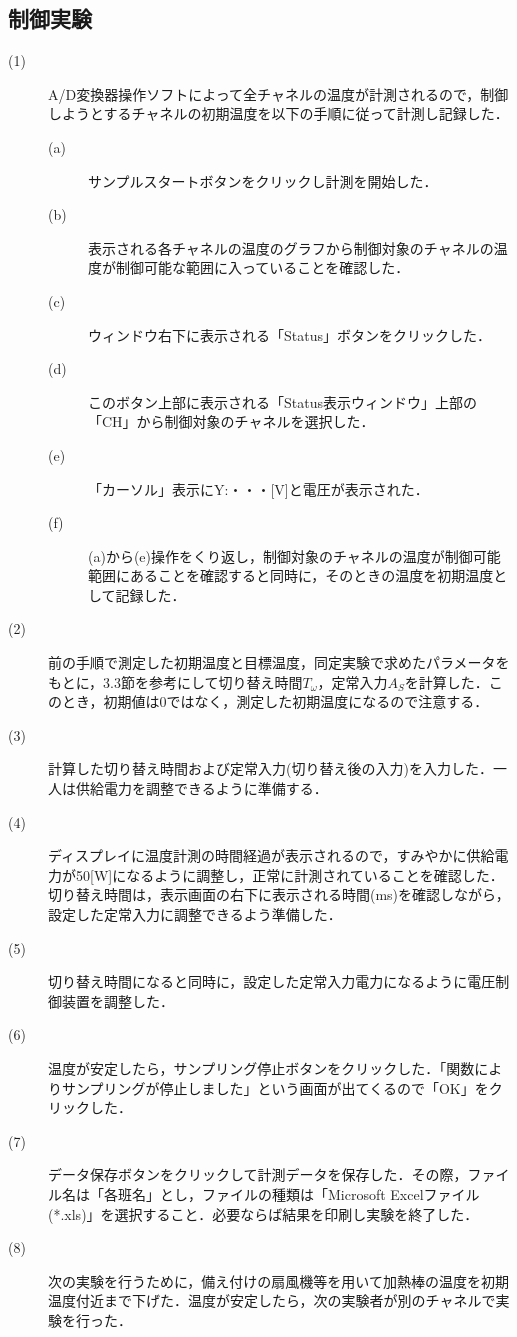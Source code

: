 \documentclass[12pt]{jsarticle}
\begin{document}
\subsection{制御実験}
\begin{description}
  \item[(1)]A/D変換器操作ソフトによって全チャネルの温度が計測されるので，制御しようとするチャネルの初期温度を以下の手順に従って計測し記録した．
  \begin{description}
    \item[(a)]サンプルスタートボタンをクリックし計測を開始した．
    \item[(b)]表示される各チャネルの温度のグラフから制御対象のチャネルの温度が制御可能な範囲に入っていることを確認した．
    \item[(c)]ウィンドウ右下に表示される「Status」ボタンをクリックした．
    \item[(d)]このボタン上部に表示される「Status表示ウィンドウ」上部の「CH」から制御対象のチャネルを選択した．
    \item[(e)]「カーソル」表示にY:・・・[V]と電圧が表示された．
    \item[(f)](a)から(e)操作をくり返し，制御対象のチャネルの温度が制御可能範囲にあることを確認すると同時に，そのときの温度を初期温度として記録した．
  \end{description}
  \item[(2)]前の手順で測定した初期温度と目標温度，同定実験で求めたパラメータをもとに，3.3節を参考にして切り替え時間$T_{\omega}$，定常入力$A_S$を計算した．このとき，初期値は0ではなく，測定した初期温度になるので注意する．
  \item[(3)]計算した切り替え時間および定常入力(切り替え後の入力)を入力した．一人は供給電力を調整できるように準備する．
  \item[(4)]ディスプレイに温度計測の時間経過が表示されるので，すみやかに供給電力が50[W]になるように調整し，正常に計測されていることを確認した．切り替え時間は，表示画面の右下に表示される時間(ms)を確認しながら，設定した定常入力に調整できるよう準備した．
  \item[(5)]切り替え時間になると同時に，設定した定常入力電力になるように電圧制御装置を調整した．
  \item[(6)]温度が安定したら，サンプリング停止ボタンをクリックした．「関数によりサンプリングが停止しました」という画面が出てくるので「OK」をクリックした．
  \item[(7)]データ保存ボタンをクリックして計測データを保存した．その際，ファイル名は「各班名」とし，ファイルの種類は「Microsoft Excelファイル(*.xls)」を選択すること．必要ならば結果を印刷し実験を終了した．
  \item[(8)]次の実験を行うために，備え付けの扇風機等を用いて加熱棒の温度を初期温度付近まで下げた．温度が安定したら，次の実験者が別のチャネルで実験を行った．
\end{description}
\end{document}
